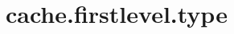 \section{cache.firstlevel.type}
\label{configuration:CacheFirstlevelType}
\AvailableInJavaAndCsharp{\TODO}